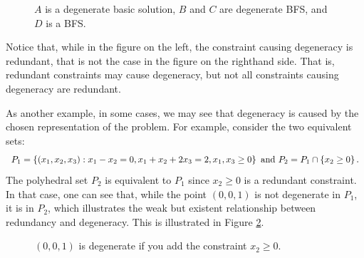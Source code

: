 \begin{figure}[h]
	\caption{$A$ is a degenerate basic solution, $B$ and $C$ are degenerate BFS, and $D$ is a BFS.} \label{p1c3:fig:figure1}
\end{figure} 

Notice that, while in the figure on the left, the constraint causing degeneracy is redundant, that is not the case in the figure on the righthand side. That is, redundant constraints may cause degeneracy, but not all constraints causing degeneracy are redundant.

As another example, in some cases, we may see that degeneracy is caused by the chosen representation of the problem. For example, consider the two equivalent sets:
%
\begin{equation*}
	P_1 = \left\{ (x_1, x_2,x_3) : x_1 - x_2 = 0, x_1 + x_2 + 2x_3 = 2, x_1, x_3 \geq 0 \right \} \text { and } P_2 = P_1 \cap \left\{ x_2 \geq 0 \right \}. 
\end{equation*}	
%
The polyhedral set $P_2$ is equivalent to $P_1$ since $x_2 \ge 0$ is a redundant constraint. In that case, one can see that, while the point $(0,0,1)$ is not degenerate in $P_1$, it is in $P_2$, which illustrates the weak but existent relationship between redundancy and degeneracy. This is illustrated in Figure \ref{p1c3:fig:redundancy_and_degeneration}.
%
\begin{figure}[h]
    \caption{$(0,0,1)$ is degenerate if you add the constraint $x_2 \ge 0$.} \label{p1c3:fig:redundancy_and_degeneration}
\end{figure}

